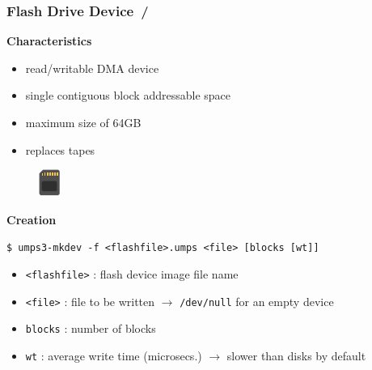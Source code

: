 \documentclass{beamer}
\begin{document}
\begin{frame}
	\frametitle{Flash Drive Device \hspace{0pt plus 1 filll} \insertframenumber\,/\,\inserttotalframenumber}
	\begin{center}
		\begin{block}{\textbf{{\small Characteristics}}}
			\begin{minipage}{0.6\textwidth}
				\vspace{0.5em}
				\begin{scriptsize}
					\begin{itemize}
						\item read/writable DMA device
						\item single contiguous block addressable space
						\item maximum size of 64GB
						\item replaces tapes
					\end{itemize}
				\end{scriptsize}
				\vspace{0.5em}
			\end{minipage}
			\hspace{0pt plus 1 filll}
			\begin{minipage}{0.25\textwidth}
				\begin{figure}[h]
					\includegraphics[scale=4]{flash-22}
				\end{figure}
			\end{minipage}
		\end{block}
		\begin{block}{\textbf{{\small Creation}}}
			\begin{scriptsize}
				\begin{center}
					\texttt{\$ umps3-mkdev -f <flashfile>.umps <file> [blocks [wt]]}
				\end{center}
				\begin{itemize}
					\item \texttt{<flashfile>} : flash device image file name
					\item \texttt{<file>} : file to be written $\rightarrow$ \texttt{/dev/null} for an empty device
					\item \texttt{blocks} : number of blocks
					\item \texttt{wt} : average write time (microsecs.) $\rightarrow$ slower than disks by default
				\end{itemize}
			\end{scriptsize}
		\end{block}
	\end{center}
\end{frame}
\end{document}

